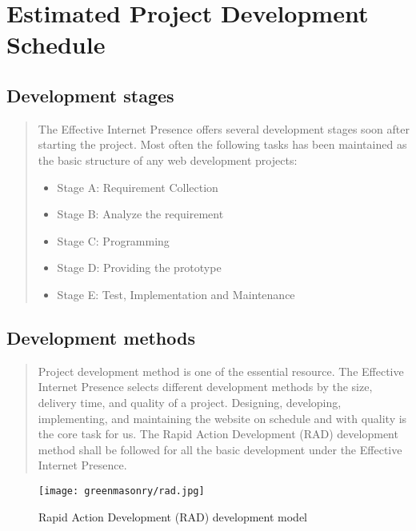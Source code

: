 \documentclass[35pt]{report}
\begin{document}
\normalsize

\chapter{Estimated Project Development Schedule}
		\section{Development stages}
 		\begin{quote}
			The Effective Internet Presence offers several development stages soon after starting the project. Most often the following tasks has been maintained as the basic structure of any web development projects:
			\begin{itemize}
				\item Stage A: Requirement Collection
				\item Stage B: Analyze the requirement
				\item Stage C: Programming
				\item Stage D: Providing the prototype
				\item Stage E: Test, Implementation and Maintenance   
			\end{itemize}
		\end{quote}

		\section{Development methods}
 		\begin{quote}
			Project development method is one of the essential resource. The Effective Internet Presence selects different development methods by the size, delivery time, and quality of a project. Designing, developing, implementing, and maintaining the website on schedule and with quality is the core task for us. The Rapid Action Development (RAD) development method shall be followed for all the basic development under the Effective Internet Presence.  
		\end{quote}

			\begin{figure}[htb]
				\begin{center}
				\texttt{[image: greenmasonry/rad.jpg]}
				\caption{Rapid Action Development (RAD) development model}
				\end{center}
			\end{figure}
\end{document}

